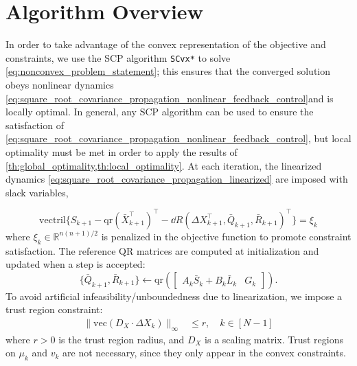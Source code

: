 \section{Algorithm Overview}
In order to take advantage of the convex representation of the objective and constraints, we use the SCP algorithm \texttt{SCvx*} \cite{oguriSuccessiveConvexificationFeasibility2023a} to solve \cref{eq:nonconvex_problem_statement}; this ensures that the converged solution obeys nonlinear dynamics \cref{eq:square_root_covariance_propagation_nonlinear_feedback_control}and is locally optimal. In general, any SCP algorithm can be used to ensure the satisfaction of \cref{eq:square_root_covariance_propagation_nonlinear_feedback_control}, but local optimality must be met in order to apply the results of \cref{th:global_optimality,th:local_optimality}. At each iteration, the linearized dynamics \cref{eq:square_root_covariance_propagation_linearized} are imposed with slack variables,\par
{
\setlength{\abovedisplayskip}{0pt} %
\setlength{\belowdisplayskip}{0pt} %
\small
\begin{equation} \label{eq:linearized_dynamics}
\mathrm{vectril} \{ S_{k+1} - \mathrm{qr}(\bar{X}_{k+1}^\top)^\top {-} \dd R(\Delta X_{k+1}^\top, \bar{Q}_{k+1}, \bar{R}_{k+1})^\top \} = \xi_k
\end{equation}
}%
where \( \xi_k \in \mathbb{R}^{n(n+1)/2}\) is penalized in the objective function to promote constraint satisfaction. 
The reference QR matrices are computed at initialization and updated when a step is accepted:
\begin{equation} \label{eq:reference_update}
	\{\bar{Q}_{k+1}, \bar{R}_{k+1}\} \gets \mathrm{qr}(\begin{bmatrix} A_k \bar{S}_k + B_k \bar{L}_k & G_k \end{bmatrix}).
\end{equation}
To avoid artificial infeasibility/unboundedness \cite{maoSuccessiveConvexificationNonConvex2016} due to linearization, we impose a trust region constraint:
\begin{align} \label{eq:trust_region_constraint}
	\|\mathrm{vec}(D_X\cdot \Delta X_k)\|_\infty &\leq r, \quad k \in [N{-}1]
\end{align}
where \( r > 0 \) is the trust region radius, and \( D_X \) is a scaling matrix.
Trust regions on \( \mu_k \) and \( v_k \) are not necessary, since they only appear in the convex constraints.

